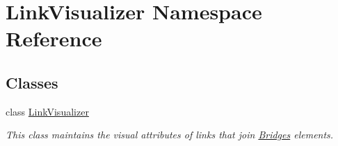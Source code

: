 \hypertarget{namespace_link_visualizer}{}\section{Link\+Visualizer Namespace Reference}
\label{namespace_link_visualizer}
\subsection*{Classes}
\begin{DoxyCompactItemize}
\item 
class \hyperlink{class_link_visualizer_1_1_link_visualizer}{Link\+Visualizer}
\begin{DoxyCompactList}\small\item\em This class maintains the visual attributes of links that join \hyperlink{namespace_bridges}{Bridges} elements. \end{DoxyCompactList}\end{DoxyCompactItemize}
